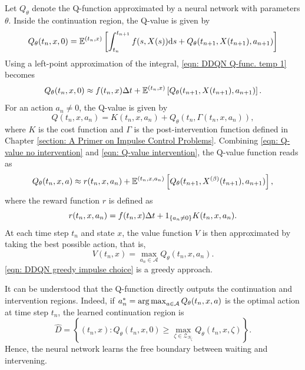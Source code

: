 Let $Q_\theta$ denote the Q-function approximated by a neural network with parameters $\theta$. Inside the continuation region, the Q-value is given by
\begin{equation}
    Q_\theta(t_n,x,0) = \mathbb{E}^{(t_n,x)}\left[\int_{t_n}^{t_{n+1}} f(s,X(s)) \mathrm{d} s + Q_\theta(t_{n+1}, X(t_{n+1}), a_{n+1}) \right]
    \label{eqn: DDQN Q-func. temp 1}
\end{equation}
Using a left-point approximation of the integral, \eqref{eqn: DDQN Q-func. temp 1} becomes
\begin{equation}
    Q_\theta(t_n,x,0) \approx f(t_n,x) \Delta t + \mathbb{E}^{(t_n,x)}\left[Q_\theta(t_{n+1}, X(t_{n+1}), a_{n+1}) \right]. 
    \label{eqn: Q-value no intervention}
\end{equation}
For an action $a_n \neq 0$, the Q-value is given by
\begin{equation}
    Q(t_n,x,a_n) = K(t_n,x,a_n) + Q_\theta(t_n, \Gamma(t_n,x,a_n)),
    \label{eqn: Q-value intervention}
\end{equation}
where $K$ is the cost function and $\Gamma$ is the post-intervention function defined in Chapter \ref{section: A Primer on Impulse Control Problems}. Combining \eqref{eqn: Q-value no intervention} and \eqref{eqn: Q-value intervention}, the Q-value function reads as
\begin{equation*}
    Q_\theta(t_n,x,a) \approx r(t_n,x,a_n) + \mathbb{E}^{(t_n,x,a_n)}\left[Q_\theta(t_{n+1}, X^{(\beta)}(t_{n+1}),a_{n+1}) \right],
\end{equation*}
where the reward function $r$ is defined as
\begin{equation*}
    r(t_n,x,a_n) = f(t_n,x) \Delta t + 1_{\left\{a_n \neq 0\right\}}K(t_n,x,a_n).
\end{equation*}
At each time step $t_n$ and state $x$, the value function $V$ is then approximated by taking the best possible action, that is,
\begin{equation}
    V(t_n,x) = \max_{a_n \in \mathcal{A}} Q_\theta(t_n,x,a_n).
    \label{eqn: DDQN greedy impulse choice}
\end{equation}
\eqref{eqn: DDQN greedy impulse choice} is a greedy approach. 

It can be understood that the Q-function directly outputs the continuation and intervention regions. Indeed, if $a^*_n = \operatorname*{arg\,max}_{a \in \mathcal{A}} Q_\theta(t_n,x,a)$ is the optimal action at time step $t_n$, the learned continuation region is 
\begin{equation*}
    \hat D = \left\{ (t_n,x): Q_\theta (t_n,x,0) \geq \max_{\zeta \in \mathcal{Z}_{N_\zeta}} Q_\theta(t_n,x,\zeta) \right\}.
\end{equation*}
Hence, the neural network learns the free boundary between waiting and intervening.

